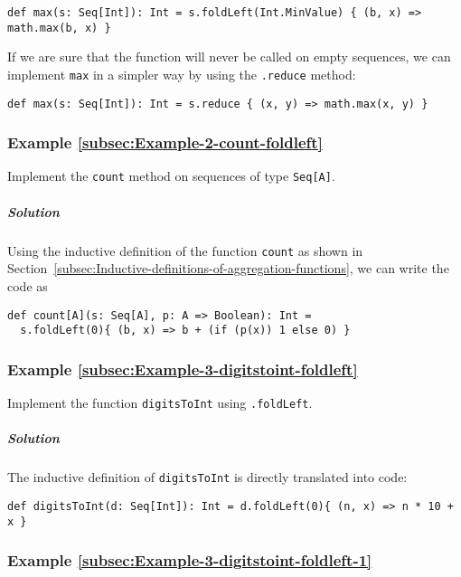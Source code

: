 \begin{lstlisting}
def max(s: Seq[Int]): Int = s.foldLeft(Int.MinValue) { (b, x) => math.max(b, x) }
\end{lstlisting}
If we are sure that the function will never be called on empty sequences,
we can implement \lstinline!max! in a simpler way by using the \lstinline!.reduce!
method:
\begin{lstlisting}
def max(s: Seq[Int]): Int = s.reduce { (x, y) => math.max(x, y) }
\end{lstlisting}


\subsubsection{Example \label{subsec:Example-2-count-foldleft}\ref{subsec:Example-2-count-foldleft}}

Implement the \lstinline!count! method on sequences of type \lstinline!Seq[A]!.

\subparagraph{Solution}

Using the inductive definition of the function \lstinline!count!
as shown in Section~\ref{subsec:Inductive-definitions-of-aggregation-functions},
we can write the code as

\begin{lstlisting}
def count[A](s: Seq[A], p: A => Boolean): Int =
  s.foldLeft(0){ (b, x) => b + (if (p(x)) 1 else 0) }
\end{lstlisting}


\subsubsection{Example \label{subsec:Example-3-digitstoint-foldleft}\ref{subsec:Example-3-digitstoint-foldleft}}

Implement the function \lstinline!digitsToInt! using \lstinline!.foldLeft!.

\subparagraph{Solution}

The inductive definition of \lstinline!digitsToInt! is directly translated
into code:

\begin{lstlisting}
def digitsToInt(d: Seq[Int]): Int = d.foldLeft(0){ (n, x) => n * 10 + x }
\end{lstlisting}


\subsubsection{Example \label{subsec:Example-3-digitstoint-foldleft-1}\ref{subsec:Example-3-digitstoint-foldleft-1}}

